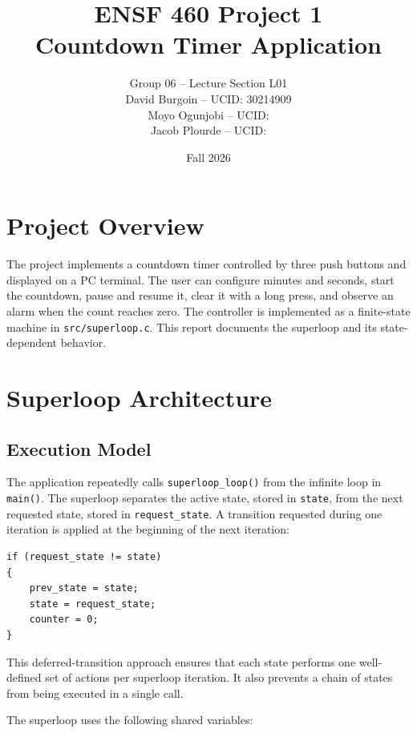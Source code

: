 \documentclass[11pt]{article}
\title{ENSF 460 Project 1\\Countdown Timer Application}
\author{
    Group 06 -- Lecture Section L01\\[0.5em]
    David Burgoin -- UCID: 30214909 \\
    Moyo Ogunjobi -- UCID: \\
    Jacob Plourde -- UCID: 
}
\date{Fall 2026}
\newcommand{\code}[1]{\texttt{#1}}
\begin{document}
\maketitle
\tableofcontents
\newpage

\section{Project Overview}

The project implements a countdown timer controlled by three push buttons and displayed on a PC terminal. The user can configure minutes and seconds, start the countdown, pause and resume it, clear it with a long press, and observe an alarm when the count reaches zero. The controller is implemented as a finite-state machine in \code{src/superloop.c}. This report documents the superloop and its state-dependent behavior.

\section{Superloop Architecture}

\subsection{Execution Model}

The application repeatedly calls \code{superloop\_loop()} from the infinite loop in \code{main()}. The superloop separates the active state, stored in \code{state}, from the next requested state, stored in \code{request\_state}. A transition requested during one iteration is applied at the beginning of the next iteration:

\begin{verbatim}
if (request_state != state)
{
    prev_state = state;
    state = request_state;
    counter = 0;
}
\end{verbatim}

This deferred-transition approach ensures that each state performs one well-defined set of actions per superloop iteration. It also prevents a chain of states from being executed in a single call.

The superloop uses the following shared variables:
\end{document}
